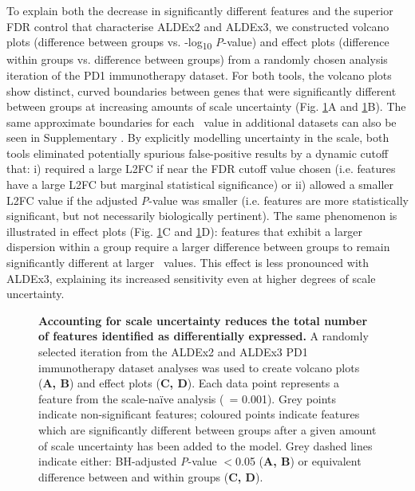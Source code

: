 \documentclass[10pt,letterpaper]{article}
\begin{document}
To explain both the decrease in significantly different features and the superior FDR control that characterise ALDEx2 and ALDEx3, we constructed volcano plots \cite{Cui:2003aa} (difference between groups vs. -log\textsubscript{10} \textit{P}-value) and effect plots \cite{gloor:effect} (difference within groups vs. difference between groups) from a randomly chosen analysis iteration of the PD1 immunotherapy dataset. For both tools, the volcano plots show distinct, curved boundaries between genes that were significantly different between groups at increasing amounts of scale uncertainty (Fig. \ref{fig:volcano}A and \ref{fig:volcano}B). The same approximate boundaries for each \textgamma~value in additional datasets can also be seen in Supplementary . By explicitly modelling uncertainty in the scale, both tools eliminated potentially spurious false-positive results by a dynamic cutoff that: i) required a large L2FC if near the FDR cutoff value chosen (i.e. features have a large L2FC but marginal statistical significance) or ii) allowed a smaller L2FC value if the adjusted \textit{P}-value was smaller (i.e. features are more statistically significant, but not necessarily biologically pertinent). The same phenomenon is illustrated in effect plots (Fig. \ref{fig:volcano}C and \ref{fig:volcano}D): features that exhibit a larger dispersion within a group require a larger difference between groups to remain significantly different at larger \textgamma~values. This effect is less pronounced with ALDEx3, explaining its increased sensitivity even at higher degrees of scale uncertainty.

\begin{figure}[H]
    \centering
    \caption{\textbf{Accounting for scale uncertainty reduces the total number of features identified as differentially expressed.} A randomly selected iteration from the ALDEx2 and ALDEx3 PD1 immunotherapy dataset analyses was used to create volcano plots (\textbf{A, B}) and effect plots (\textbf{C, D}). Each data point represents a feature from the scale-na\"ive analysis (\textgamma~= 0.001). Grey points indicate non-significant features; coloured points indicate features which are significantly different between groups after a given amount of scale uncertainty has been added to the model. Grey dashed lines indicate either: BH-adjusted \textit{P}-value $<$0.05 (\textbf{A, B}) or equivalent difference between and within groups (\textbf{C, D}).}   
    \label{fig:volcano}
\end{figure}
\end{document}

